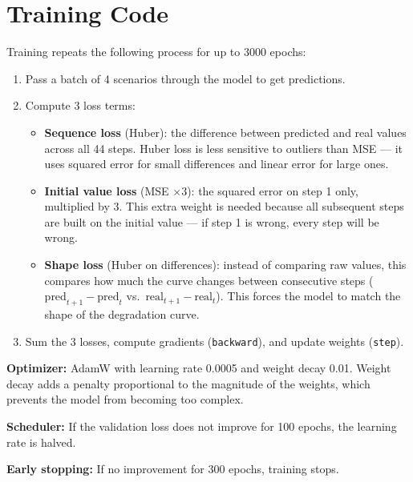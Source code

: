 \documentclass[11pt,a4paper]{article}
\begin{document}
\section{Training Code}

Training repeats the following process for up to 3000 epochs:
\begin{enumerate}[nosep]
    \item Pass a batch of 4 scenarios through the model to get predictions.
    \item Compute 3 loss terms:
    \begin{itemize}[nosep]
        \item \textbf{Sequence loss} (Huber): the difference between predicted and real values across all 44 steps. Huber loss is less sensitive to outliers than MSE --- it uses squared error for small differences and linear error for large ones.
        \item \textbf{Initial value loss} (MSE $\times 3$): the squared error on step 1 only, multiplied by 3. This extra weight is needed because all subsequent steps are built on the initial value --- if step 1 is wrong, every step will be wrong.
        \item \textbf{Shape loss} (Huber on differences): instead of comparing raw values, this compares how much the curve changes between consecutive steps ($\text{pred}_{t+1} - \text{pred}_t$ vs.\ $\text{real}_{t+1} - \text{real}_t$). This forces the model to match the shape of the degradation curve.
    \end{itemize}
    \item Sum the 3 losses, compute gradients (\texttt{backward}), and update weights (\texttt{step}).
\end{enumerate}
\textbf{Optimizer:} AdamW with learning rate 0.0005 and weight decay 0.01. Weight decay adds a penalty proportional to the magnitude of the weights, which prevents the model from becoming too complex.

\textbf{Scheduler:} If the validation loss does not improve for 100 epochs, the learning rate is halved.

\textbf{Early stopping:} If no improvement for 300 epochs, training stops.
\end{document}
